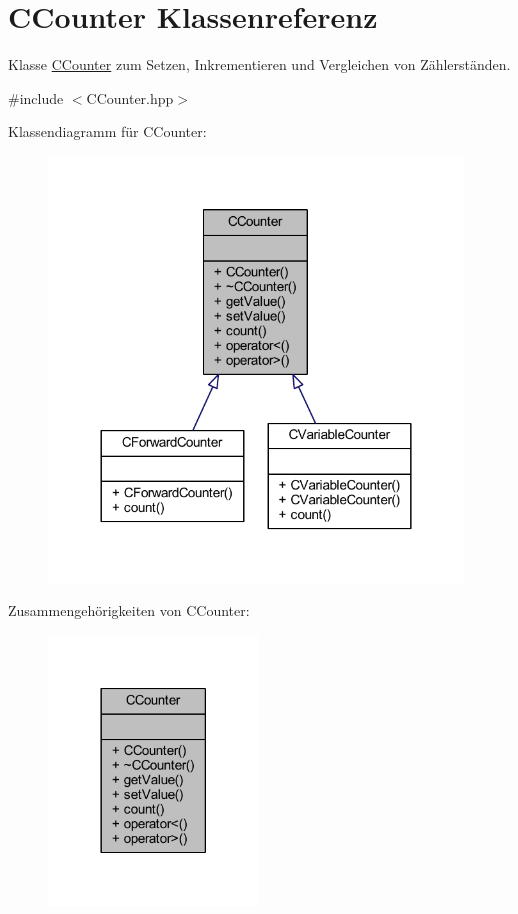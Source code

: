 \hypertarget{class_c_counter}{}\section{C\+Counter Klassenreferenz}
\label{class_c_counter}


Klasse \hyperlink{class_c_counter}{C\+Counter} zum Setzen, Inkrementieren und Vergleichen von Zählerständen.  




{\ttfamily \#include $<$C\+Counter.\+hpp$>$}



Klassendiagramm für C\+Counter\+:
\nopagebreak
\begin{figure}[H]
\begin{center}
\leavevmode
\includegraphics[width=312pt]{class_c_counter__inherit__graph}
\end{center}
\end{figure}


Zusammengehörigkeiten von C\+Counter\+:
\nopagebreak
\begin{figure}[H]
\begin{center}
\leavevmode
\includegraphics[width=158pt]{class_c_counter__coll__graph}
\end{center}
\end{figure}
